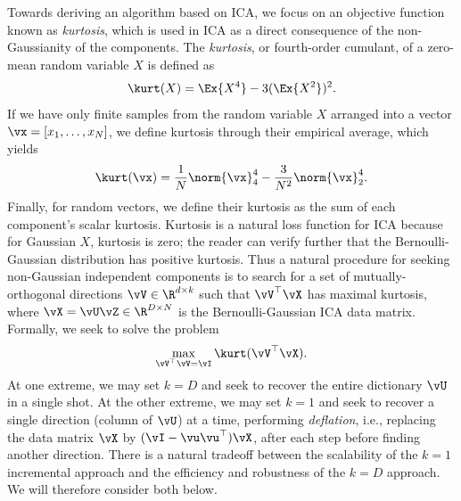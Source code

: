\documentclass[../../book-main.tex]{subfiles}
\begin{document}
Towards deriving an algorithm based on ICA, we focus on an objective function known as \textit{kurtosis}, which is used in ICA as a direct consequence of the non-Gaussianity of the components. The \textit{kurtosis}, or fourth-order cumulant, of a zero-mean random variable $X$ is defined as
\begin{equation}\label{eq:kurtosis}
\kurt(X) = \Ex{X^4} - 3 (\Ex{X^2})^2.
\end{equation}
If we have only finite samples from the random variable $X$ arranged into a vector $\vx = [x_1, \dots, x_N]$, we define kurtosis through their empirical average, which yields
\begin{equation}\label{eq:kurtosis-vector}
\kurt(\vx) = \frac{1}{N} \norm{\vx}_4^4 - \frac{3}{N^2} \norm{\vx}_2^4.
\end{equation}
Finally, for random vectors, we define their kurtosis as the sum of each component's scalar kurtosis.
Kurtosis is a natural loss function for ICA because for Gaussian $X$, kurtosis is zero; the reader can verify further that the Bernoulli-Gaussian distribution has positive kurtosis. 
Thus a natural procedure for seeking non-Gaussian independent components is to search for a set of mutually-orthogonal directions $\vV \in \R^{d \times k}$ such that $\vV^\top \vX$ has maximal kurtosis, where $\vX = \vU \vZ \in \R^{D \times N}$ is the Bernoulli-Gaussian ICA data matrix.
Formally, we seek to solve the problem
\begin{equation}
    \max_{\vV^\top \vV = \vI} \kurt(\vV^\top \vX).
\end{equation}
At one extreme, we may set $k = D$ and seek to recover the entire dictionary $\vU$ in a single shot.  At the other extreme, we may set $k=1$ and seek to recover a single direction (column of $\vU$) at a time, performing \textit{deflation}, i.e., replacing the data matrix $\vX$ by $(\vI - \vu\vu^\top) \vX$, after each step before finding another direction.
There is a natural tradeoff between the scalability of the $k=1$ incremental approach and the efficiency and robustness of the $k=D$ approach. We will therefore consider both below.
\end{document}
